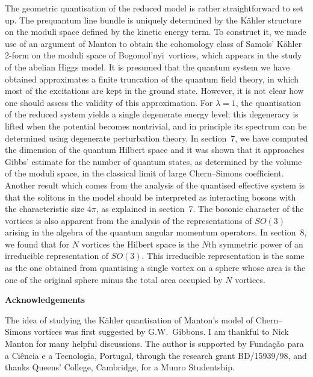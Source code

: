 \documentclass[a4paper,11pt]{article}
\begin{document}
The geometric quantisation of the reduced model is rather
straightforward to set up. The prequantum line bundle is uniquely 
determined by the K\"ahler structure on the moduli space defined by 
the kinetic energy term. To construct it, we made use of an 
argument of Manton \cite{Msmv} to obtain the cohomology class of  
Samols' K\"ahler 2-form on the moduli space of Bogomol'ny\u\i\
vortices, which appears in the study of the abelian Higgs model. 
It is presumed that the quantum system we have obtained 
approximates a finite truncation of the quantum field theory,
in which most of the excitations are kept in the ground state.
However, it is not clear how one should assess the validity of
this approximation.
For $\lambda=1$, the quantisation of the reduced system yields a
single degenerate energy level; this degeneracy is lifted when the
potential becomes nontrivial, and in principle its spectrum can be 
determined using degenerate perturbation theory.
In section~7, we have computed the dimension of the
quantum Hilbert space and it was shown that it approaches
Gibbs' estimate for the number of quantum states, as determined by the 
volume of the moduli space, in the classical limit of large 
Chern--Simons coefficient. Another result which comes from the
analysis of the quantised effective system is that the solitons in
the model should be interpreted as interacting bosons with the
characteristic size $4\pi$, as explained in section~7. The bosonic
character of the vortices is also apparent from the analysis of
the representations of $SO(3)$ arising in the algebra of the quantum
angular momentum operators. In section~8, we found that 
for $N$ vortices the Hilbert space is the $N$th symmetric power of an
irreducible representation of $SO(3)$. This irreducible representation
is the same as the one obtained from quantising a single vortex on a 
sphere whose area is the one of the original sphere minus the total area 
occupied by $N$ vortices. 
 

\vspace{2cm}
\noindent
{\large \bf{Acknowledgements}}
\vspace{.5cm}

\noindent
The idea of studying the K\"ahler quantisation of Manton's model
of Chern--Simons vortices was first suggested by G.W.~Gibbons.
I am thankful to Nick Manton for many helpful discussions.
The author is supported by Funda\c{c}\~ao para a Ci\^encia e a
Tecnologia, Portugal, through the research grant BD/15939/98, and
thanks Queens' College, Cambridge, for a Munro Studentship.
\end{document}
